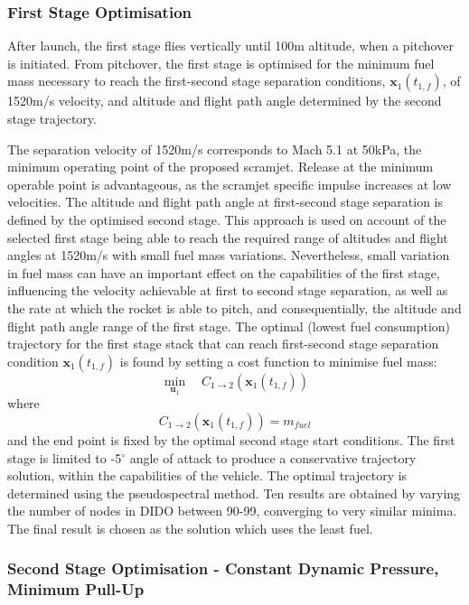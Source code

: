 \subsubsection{First Stage Optimisation}
After launch, the first stage flies vertically until 100m altitude, when a pitchover is initiated. 
From pitchover, the first stage is optimised for the minimum fuel mass necessary to reach the first-second stage separation conditions, $\textbf{x}_1(t_{1,f})$, of 1520m/s velocity, and altitude and flight path angle determined by the second stage trajectory. 

The separation velocity of 1520m/s corresponds to Mach 5.1 at 50kPa, the minimum operating point of the proposed scramjet\cite{Preller2017b}. Release at the minimum operable point is advantageous, as the scramjet specific impulse increases at low velocities\cite{Preller2017b}.
The altitude and flight path angle at first-second stage separation is defined by the optimised second stage. This approach is used on account of the selected first stage being able to reach the required range of altitudes and flight angles at 1520m/s  with small fuel mass variations. 
Nevertheless, small variation in fuel mass can have an important effect on the capabilities of the first stage, influencing the velocity achievable at first to second stage separation, as well as the rate at which the rocket is able to pitch, and consequentially, the altitude and flight path angle range of the first stage.
The optimal (lowest fuel consumption) trajectory for the first stage stack that can reach first-second stage separation condition $\textbf{x}_1(t_{1,f})$ is found by setting a cost function to minimise fuel mass:
\begin{equation}
\min\limits_{\textbf{u}_1} \quad  C_{1 \rightarrow 2}(\textbf{x}_1(t_{1,f}))
\end{equation}
where
\begin{equation}
C_{1 \rightarrow 2}(\textbf{x}_1(t_{1,f})) = m_{fuel}
\end{equation}
and the end point is fixed by the optimal second stage start conditions. The first stage is limited to -5$^\circ$ angle of attack to produce a conservative trajectory solution, within the capabilities of the vehicle. The optimal trajectory is determined using the pseudospectral method. Ten results are obtained by varying the number of nodes in DIDO between 90-99, converging to very similar minima. The final result is chosen as the solution which uses the least fuel.


\subsubsection{Second Stage Optimisation - Constant Dynamic Pressure, Minimum Pull-Up}


